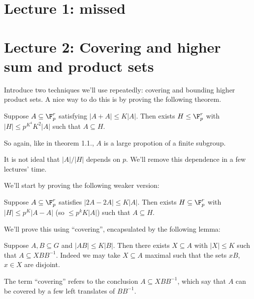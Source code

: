 \documentclass[a4paper]{article}
\begin{document}


\tableofcontents

\section*{Lecture 1: missed}

\clearpage

\section*{Lecture 2: Covering and higher sum and product sets}

Introduce two techniques we'll use repeatedly: covering and bounding higher product sets. A nice way to do this is by proving the following theorem.

\begin{theorem}[Ruzsa]
  Suppose \(A \subseteq \F_p^r\) satisfying \(|A + A| \leq K |A|\). Then exists \(H \leq \F_p^r\) with \(|H| \leq p^{K^4} K^2 |A|\) such that \(A \subseteq H\).
\end{theorem}

So again, like in theorem 1.1., \(A\) is a large propotion of a finite subgroup.

\begin{remark}
  It is not ideal that \(|A|/|H|\) depends on \(p\). We'll remove this dependence in a few lectures' time.
\end{remark}

We'll start by proving the following weaker version:

\begin{proposition}
  Suppose \(A \subseteq \F_p^r\) satisfies \(|2A - 2A| \leq K |A|\). Then exists \(H \subseteq \F_p^r\) with \(|H| \leq p^K|A - A|\) (so \(\leq p^k K|A|\)) such that \(A \subseteq H\).
\end{proposition}

We'll prove this using ``covering'', encapsulated by the following lemma:

\begin{lemma}
  Suppose \(A, B \subseteq G\) and \(|AB| \leq K |B|\). Then there exists \(X \subseteq A\) with \(|X| \leq K\) such that \(A \subseteq XBB^{-1}\). Indeed we may take \(X \subseteq A\) maximal such that the sets \(xB\), \(x \in X\) are disjoint.
\end{lemma}

The term ``covering'' refers to the conclusion \(A \subseteq XBB^{-1}\), which say that \(A\) can be covered by a few left translates of \(BB^{-1}\).
\end{document}
